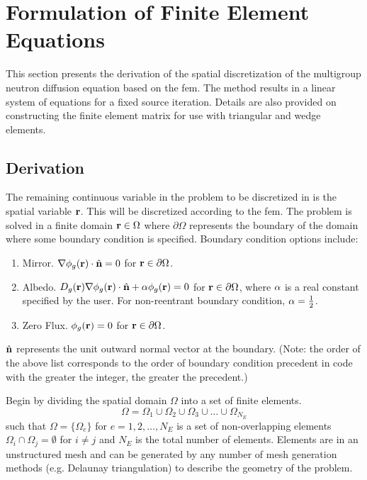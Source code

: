 \section{Formulation of Finite Element Equations}
  \label{sec:formulation}
  This section presents the derivation of the spatial discretization of the
  multigroup neutron diffusion equation based on the \gls{fem}. The method 
  results in a linear system of equations for a fixed source iteration. Details 
  are also provided on constructing the finite element matrix for use with 
  triangular and wedge elements.

  \subsection{Derivation}
    \label{sec:formulation:derivation}
    The remaining continuous variable in the problem to be discretized in
      is the spatial variable $\mathbf{r}$. This will be 
    discretized according to the \gls{fem}. The problem is solved in a finite 
    domain $\mathbf{r} \in \Omega$ where $\partial \Omega$ represents the boundary of 
    the domain where some boundary condition is specified. Boundary condition 
    options include:
    \begin{enumerate}
      \item Mirror. $\mathbf{\nabla} \phi_g(\mathbf{r}) \cdot \hat{\mathbf{n}} = 0$ for 
        $\mathbf{r} \in \partial \Omega$.
      \item Albedo. $D_g(\mathbf{r}) \mathbf{\nabla} \phi_g(\mathbf{r}) \cdot \hat{\mathbf{n}} + 
        \alpha \phi_g(\mathbf{r})=0$ for $\mathbf{r} \in \partial \Omega$,
        where $\alpha$ is a real constant specified
        by the user. For non-reentrant boundary condition, $\alpha = \frac{1}{2}$.
      \item Zero Flux. $\phi_g(\mathbf{r}) = 0$ for $\mathbf{r} \in \partial \Omega$.
    \end{enumerate}
    $\hat{\mathbf{n}}$ represents the unit outward normal vector at the boundary.
    (Note: the order of the above list corresponds to the order of boundary 
    condition precedent in code with the greater the integer, the greater the 
    precedent.)
    
    Begin by dividing the spatial domain $\Omega$ into a set of finite elements.
    \begin{equation}
      \label{eq:set_of_elements}
      \Omega = \Omega_1 \cup \Omega_2 \cup \Omega_3 \cup \ldots \cup
        \Omega_{N_E} 
    \end{equation}
    such that $\Omega = \{\Omega_e\}$ for $e = 1,2,\ldots,N_E$ is a set of
    non-overlapping elements $\Omega_i \cap \Omega_j = \emptyset$ for $i \ne j$ 
    and $N_E$ is the total number of elements. Elements are in an unstructured
    mesh and can be generated by any number of mesh generation methods 
    (e.g. Delaunay triangulation) to describe the geometry of the problem.
    
